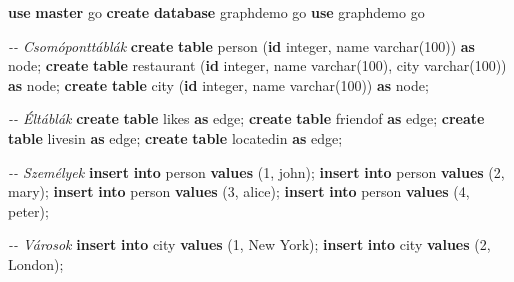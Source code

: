 \documentclass[
  magyar,
]{article}
\newenvironment{Shaded}{}{}
\newcommand{\CommentTok}[1]{\textcolor[rgb]{0.38,0.63,0.69}{\textit{#1}}}
\newcommand{\DataTypeTok}[1]{\textcolor[rgb]{0.56,0.13,0.00}{#1}}
\newcommand{\DecValTok}[1]{\textcolor[rgb]{0.25,0.63,0.44}{#1}}
\newcommand{\KeywordTok}[1]{\textcolor[rgb]{0.00,0.44,0.13}{\textbf{#1}}}
\newcommand{\NormalTok}[1]{#1}
\newcommand{\StringTok}[1]{\textcolor[rgb]{0.25,0.44,0.63}{#1}}
\begin{document}
\begin{Shaded}
\begin{Highlighting}[]
\KeywordTok{use} \KeywordTok{master}
\NormalTok{go}
\KeywordTok{create} \KeywordTok{database}\NormalTok{ graphdemo}
\NormalTok{go}
\KeywordTok{use}\NormalTok{ graphdemo}
\NormalTok{go}

\CommentTok{{-}{-} Csomóponttáblák}
\KeywordTok{create} \KeywordTok{table}\NormalTok{ person (}\KeywordTok{id} \DataTypeTok{integer}\NormalTok{, name }\DataTypeTok{varchar}\NormalTok{(}\DecValTok{100}\NormalTok{)) }\KeywordTok{as}\NormalTok{ node;}
\KeywordTok{create} \KeywordTok{table}\NormalTok{ restaurant (}\KeywordTok{id} \DataTypeTok{integer}\NormalTok{, name }\DataTypeTok{varchar}\NormalTok{(}\DecValTok{100}\NormalTok{), city }\DataTypeTok{varchar}\NormalTok{(}\DecValTok{100}\NormalTok{)) }\KeywordTok{as}\NormalTok{ node;}
\KeywordTok{create} \KeywordTok{table}\NormalTok{ city (}\KeywordTok{id} \DataTypeTok{integer}\NormalTok{, name }\DataTypeTok{varchar}\NormalTok{(}\DecValTok{100}\NormalTok{)) }\KeywordTok{as}\NormalTok{ node;}

\CommentTok{{-}{-} Éltáblák}
\KeywordTok{create} \KeywordTok{table}\NormalTok{ likes }\KeywordTok{as}\NormalTok{ edge;}
\KeywordTok{create} \KeywordTok{table}\NormalTok{ friendof }\KeywordTok{as}\NormalTok{ edge;}
\KeywordTok{create} \KeywordTok{table}\NormalTok{ livesin }\KeywordTok{as}\NormalTok{ edge;}
\KeywordTok{create} \KeywordTok{table}\NormalTok{ locatedin }\KeywordTok{as}\NormalTok{ edge;}

\CommentTok{{-}{-} Személyek}
\KeywordTok{insert} \KeywordTok{into}\NormalTok{ person }\KeywordTok{values}\NormalTok{ (}\DecValTok{1}\NormalTok{, }\StringTok{\textquotesingle{}john\textquotesingle{}}\NormalTok{);}
\KeywordTok{insert} \KeywordTok{into}\NormalTok{ person }\KeywordTok{values}\NormalTok{ (}\DecValTok{2}\NormalTok{, }\StringTok{\textquotesingle{}mary\textquotesingle{}}\NormalTok{);}
\KeywordTok{insert} \KeywordTok{into}\NormalTok{ person }\KeywordTok{values}\NormalTok{ (}\DecValTok{3}\NormalTok{, }\StringTok{\textquotesingle{}alice\textquotesingle{}}\NormalTok{);}
\KeywordTok{insert} \KeywordTok{into}\NormalTok{ person }\KeywordTok{values}\NormalTok{ (}\DecValTok{4}\NormalTok{, }\StringTok{\textquotesingle{}peter\textquotesingle{}}\NormalTok{);}

\CommentTok{{-}{-} Városok}
\KeywordTok{insert} \KeywordTok{into}\NormalTok{ city }\KeywordTok{values}\NormalTok{ (}\DecValTok{1}\NormalTok{, }\StringTok{\textquotesingle{}New York\textquotesingle{}}\NormalTok{);}
\KeywordTok{insert} \KeywordTok{into}\NormalTok{ city }\KeywordTok{values}\NormalTok{ (}\DecValTok{2}\NormalTok{, }\StringTok{\textquotesingle{}London\textquotesingle{}}\NormalTok{);}


\end{Highlighting}
\end{Shaded}
\end{document}
